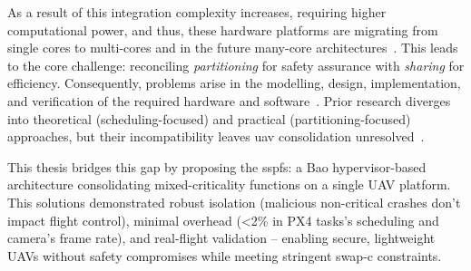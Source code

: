 As a result of this integration
complexity increases, requiring higher computational power, and thus, these
hardware platforms are migrating from single cores to multi-cores and in the
future many-core architectures~\cite{burns2022mixed}.
This leads to the core challenge: reconciling \emph{partitioning} for safety
assurance with \emph{sharing} for efficiency.
Consequently, problems arise in the modelling, design, implementation, and
verification of the required hardware and software~\cite{burns2022mixed}.
Prior research diverges into theoretical (scheduling-focused) and practical (partitioning-focused) approaches, but their incompatibility leaves \gls{uav} consolidation unresolved~\cite{burns2022mixed}. 


This thesis bridges this gap by proposing the \gls{sspfs}: a Bao
hypervisor-based architecture consolidating mixed-criticality functions on a
single UAV platform. This solutions demonstrated robust isolation (malicious non-critical
crashes don't impact flight control), minimal overhead (<2\% in PX4 tasks's
scheduling and camera's frame rate), and real-flight validation -- enabling secure, lightweight UAVs without safety compromises while meeting stringent \gls{swap-c} constraints.

%

